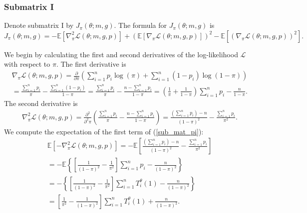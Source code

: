 \documentclass[12pt]{article}
\begin{document}
\begin{appendices}
\begin{refsection}
		\subsubsection*{Submatrix I}
		Denote submatrix I by $J_{\pi}(\theta; m, g).$ The formula for $J_{\pi}(\theta; m, g)$ is 
		\begin{equation}\label{sub_mat_pi}
		J_{\pi}(\theta; m, g) = -\mathbb{E}\left[\nabla^2_\pi \mathcal{L}(\theta; m, g, p) \right] + \left(\mathbb{E}\left[ \nabla_\pi \mathcal{L}(\theta; m, g, p) \right] \right)^2 - \mathbb{E}\left[(\nabla_\pi \mathcal{L}(\theta; m, g, p))^2 \right].
		\end{equation}
		
		We begin by calculating the first and second derivatives of the log-likelihood $\mathcal{L}$ with respect to $\pi$. The first derivative is
		\begin{multline}\label{d_L_d_pi}
		\nabla_\pi \mathcal{L}(\theta; m, g, p) = \frac{\partial }{\partial \pi } \left( \sum_{i=1}^n p_i \log(\pi) + \sum_{i=1}^n (1 - p_i) \log(1 - \pi) \right) \\ = \frac{ \sum_{i=1}^n p_i }{\pi} - \frac{ \sum_{i=1}^n (1 - p_i) }{ 1 - \pi } = \frac{\sum_{i=1}^n p_i}{\pi} - \frac{n - \sum_{i=1}^n p_i}{1 - \pi} = \left( \frac{1}{\pi} + \frac{1}{1 - \pi} \right) \sum_{i=1}^n p_i - \frac{n}{1-\pi}.
		\end{multline}
		The second derivative is
		\begin{multline*}
		\nabla^2_\pi \mathcal{L}(\theta; m, g, p)  = \frac{\partial^2}{\partial^2\pi} \left( \frac{ \sum_{i=1}^n p_i }{ \pi } - \frac{ n - \sum_{i=1}^n p_i }{1 - \pi}  \right) = \frac{\left( \sum_{i=1}^n p_i \right) - n}{(1 - \pi)^2} - \frac{\sum_{i=1}^n p_i }{ \pi^2 }.
		\end{multline*}
		We compute the expectation of the first term of (\ref{sub_mat_pi}):
		\begin{multline}\label{submat_pi_1}
		\mathbb{E} \left[ -\nabla^2_{\pi} \mathcal{L}(\theta; m, g, p)\right] = - \mathbb{E}\left[\frac{ ( \sum_{i=1}^n p_i) - n}{(1 - \pi)^2} - \frac{\sum_{i=1}^n p_i}{\pi^2} \right] \\ = - \mathbb{E}\left\{\left[\frac{1}{(1-\pi)^2} - \frac{1}{\pi^2} \right] \sum_{i=1}^n p_i - \frac{n}{ (1 - \pi)^2 } \right\} \\ = - \left\{\left[ \frac{1}{(1-\pi)^2} - \frac{1}{\pi^2} \right] \sum_{i=1}^n T^\theta_i(1) - \frac{n}{ (1 - \pi)^2}  \right\} \\ = \left[ \frac{1}{\pi^2} - \frac{1}{(1 - \pi)^2} \right] \sum_{i=1}^n T^\theta_i(1) + \frac{n}{(1-\pi)^2}.

\end{multline}
\end{refsection}
\end{appendices}
\end{document}
